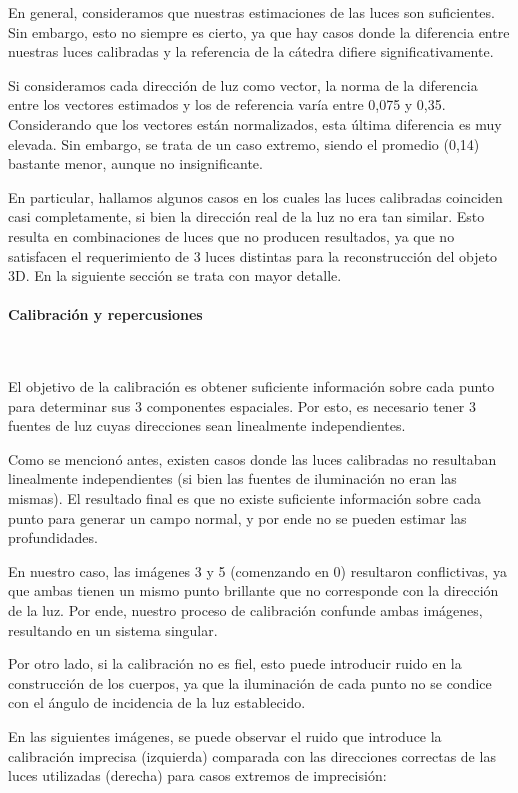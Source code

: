En general, consideramos que nuestras estimaciones de las luces son suficientes.
Sin embargo, esto no siempre es cierto, ya que hay casos donde la diferencia
entre nuestras luces calibradas y la referencia de la cátedra difiere significativamente.

Si consideramos cada dirección de luz como vector, la norma de la diferencia
entre los vectores estimados y los de referencia varía entre 0,075 y 0,35.
Considerando que los vectores están normalizados, esta última diferencia es muy elevada.
Sin embargo, se trata de un caso extremo, siendo el promedio (0,14)
bastante menor, aunque no insignificante.

En particular, hallamos algunos casos en los cuales las luces calibradas coinciden casi
completamente, si bien la dirección real de la luz no era tan similar. Esto resulta en
combinaciones de luces que no producen resultados, ya que no satisfacen el
requerimiento de 3 luces distintas para la reconstrucción del objeto 3D.
En la siguiente sección se trata con mayor detalle.

\paragraph{Calibración y repercusiones}
\

El objetivo de la calibración es obtener suficiente información sobre cada punto
para determinar sus 3 componentes espaciales. Por esto, es necesario tener 3
fuentes de luz cuyas direcciones sean linealmente independientes.

Como se mencionó antes, existen casos donde las luces calibradas no resultaban
linealmente independientes (si bien las fuentes de iluminación no eran las mismas).
El resultado final es que no existe suficiente información sobre cada punto
para generar un campo normal, y por ende no se pueden estimar las profundidades.

En nuestro caso, las imágenes 3 y 5 (comenzando en 0) resultaron conflictivas,
ya que ambas tienen un mismo punto brillante que no corresponde con la dirección
de la luz. Por ende, nuestro proceso de calibración confunde ambas imágenes,
resultando en un sistema singular.

Por otro lado, si la calibración no es fiel, esto puede introducir ruido en
la construcción de los cuerpos, ya que la iluminación de cada punto no
se condice con el ángulo de incidencia de la luz establecido.

En las siguientes imágenes, se puede observar el ruido que introduce la calibración
imprecisa (izquierda) comparada con las direcciones correctas de las luces utilizadas
(derecha) para casos extremos de imprecisión:

